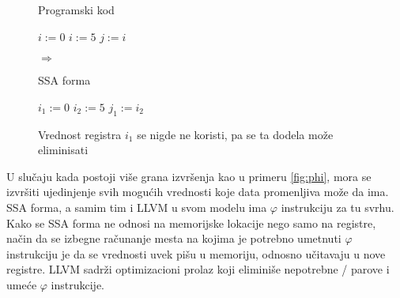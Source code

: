 \begin{figure}[h]
\begin{minipage}[t][8em]{0.45\textwidth}
  \begin{algorithm}[H]
  \caption{Programski kod}
  \begin{algorithmic}
		\State $i := 0$
		\State $i := 5$
		\State $j := i$
  \end{algorithmic}
  \end{algorithm}
\end{minipage}
\begin{minipage}[t][8em][c]{0.05\textwidth}
  $\Rightarrow$
\end{minipage}
\begin{minipage}[t][8em]{0.45\textwidth}
  \begin{algorithm}[H]
  \caption{SSA forma}
  \begin{algorithmic}
		\State $i_1 := 0$
		\State $i_2 := 5$
		\State $j_1 := i_2$
  \end{algorithmic}
  \end{algorithm}
\end{minipage}
\caption{Vrednost registra $i_1$ se nigde ne koristi, pa se ta dodela može eliminisati}
\end{figure}

U slučaju kada postoji više grana izvršenja kao u primeru \ref{fig:phi}, mora se izvršiti ujedinjenje svih mogućih vrednosti koje data promenljiva može da ima.
SSA forma, a samim tim i LLVM u svom modelu ima $\varphi$ instrukciju za tu svrhu.
Kako se SSA forma ne odnosi na memorijske lokacije nego samo na registre, način da se izbegne računanje mesta na kojima je potrebno umetnuti $\varphi$ instrukciju je da se vrednosti uvek pišu u memoriju, odnosno učitavaju u nove registre.
LLVM sadrži optimizacioni prolaz koji eliminiše nepotrebne / parove i umeće $\varphi$ instrukcije.

